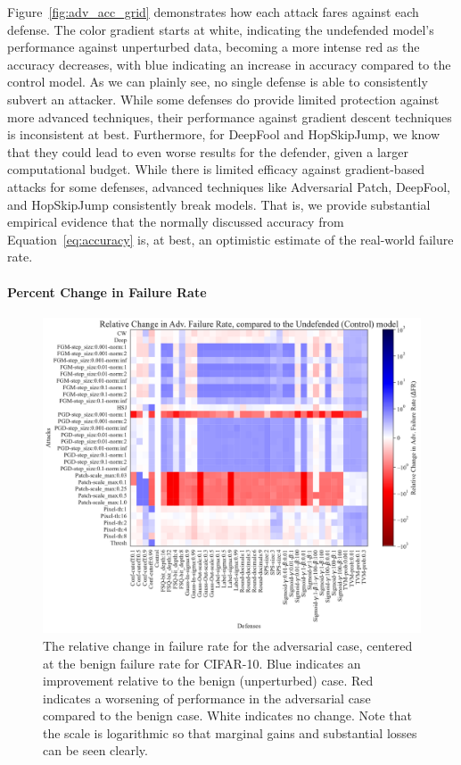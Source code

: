 \documentclass[journal]{IEEEtran}
\begin{document}
Figure~\ref{fig:adv_acc_grid} demonstrates how each attack fares against each defense. The color gradient starts at white, indicating the undefended model's performance against unperturbed data, becoming a more intense red as the accuracy decreases, with blue indicating an increase in accuracy compared to the control model. As we can plainly see, no single defense is able to consistently subvert an attacker.  While some defenses do provide limited protection against more advanced techniques, their performance against gradient descent techniques is inconsistent at best. Furthermore, for DeepFool and HopSkipJump, we know that they could lead to even worse results for the defender, given a larger computational budget. While there is limited efficacy against gradient-based attacks for some defenses, advanced techniques like Adversarial Patch, DeepFool, and HopSkipJump consistently break models. That is, we provide substantial empirical evidence that the normally discussed accuracy from Equation~\ref{eq:accuracy} is, at best, an optimistic estimate of the real-world failure rate.



\paragraph{Percent Change in Failure Rate}
\begin{figure}[!hptb]
    {\centering
    \includegraphics[trim={0 0.85em 0 0.35em},clip,height=0.6\textwidth]{images/cifar-10/gap_grid.pdf}
    \vspace{-0.75em}
    \caption{The relative change in failure rate for the adversarial case, centered at the benign failure rate for CIFAR-10. Blue indicates an improvement relative to the benign (unperturbed) case. Red indicates a worsening of performance in the adversarial case compared to the benign case. White indicates no change. Note that the scale is logarithmic so that marginal gains and substantial losses can be seen clearly.}
    \label{fig:change_grid}
    } %
\end{figure}
\end{document}
